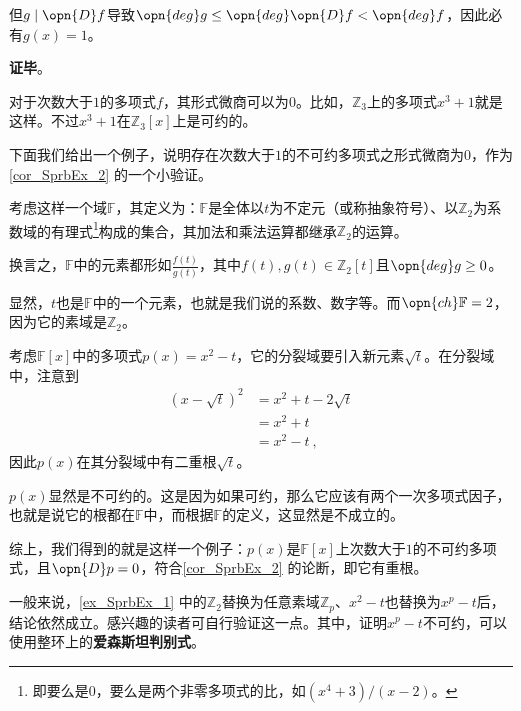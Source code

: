 但$g\mid \opn{D}f$导致$\opn{deg}g\leq\opn{deg}\opn{D}f<\opn{deg}f$，因此必有$g(x)=1$。



\textbf{证毕}。

对于次数大于$1$的多项式$f$，其形式微商可以为$0$。比如，$\mathbb{Z}_3$上的多项式$x^3+1$就是这样。不过$x^3+1$在$\mathbb{Z}_3[x]$上是可约的。

下面我们给出一个例子，说明存在次数大于$1$的不可约多项式之形式微商为$0$，作为\autoref{cor_SprbEx_2} 的一个小验证。





\begin{example}{}\label{ex_SprbEx_1}

考虑这样一个域$\mathbb{F}$，其定义为：$\mathbb{F}$是全体以$t$为不定元（或称抽象符号）、以$\mathbb{Z}_2$为系数域的有理式\footnote{即要么是$0$，要么是两个非零多项式的比，如$(x^4+3)/(x-2)$。}构成的集合，其加法和乘法运算都继承$\mathbb{Z}_2$的运算。

换言之，$\mathbb{F}$中的元素都形如$\frac{f(t)}{g(t)}$，其中$f(t), g(t)\in\mathbb{Z}_2[t]$且$\opn{deg}g\geq 0$。

显然，$t$也是$\mathbb{F}$中的一个元素，也就是我们说的系数、数字等。而$\opn{ch}\mathbb{F}=2$，因为它的素域是$\mathbb{Z}_2$。

考虑$\mathbb{F}[x]$中的多项式$p(x) = x^2-t$，它的分裂域要引入新元素$\sqrt{t}$。在分裂域中，注意到
\begin{equation}
\begin{aligned}
(x-\sqrt{t})^2&=x^2+t-2\sqrt{t}\\
&=x^2+t\\
&=x^2-t~,
\end{aligned}
\end{equation}
因此$p(x)$在其分裂域中有二重根$\sqrt{t}$。

$p(x)$显然是不可约的。这是因为如果可约，那么它应该有两个一次多项式因子，也就是说它的根都在$\mathbb{F}$中，而根据$\mathbb{F}$的定义，这显然是不成立的。

综上，我们得到的就是这样一个例子：$p(x)$是$\mathbb{F}[x]$上次数大于$1$的不可约多项式，且$\opn{D}p=0$，符合\autoref{cor_SprbEx_2} 的论断，即它有重根。

\end{example}

一般来说，\autoref{ex_SprbEx_1} 中的$\mathbb{Z}_2$替换为任意素域$\mathbb{Z}_p$、$x^2-t$也替换为$x^p-t$后，结论依然成立。感兴趣的读者可自行验证这一点。其中，证明$x^p-t$不可约，可以使用整环上的\textbf{爱森斯坦判别式}。

